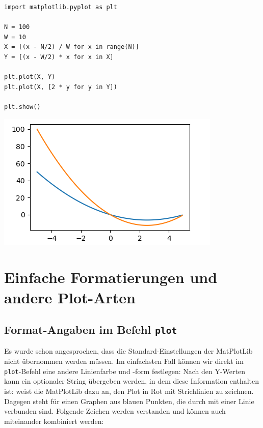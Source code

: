 \begin{codebox}[Beispiel: Zwei Graphen im selben Plot, width=.55\linewidth, nobeforeafter, equal height group = grpXmpSimplePlotTwoFunc]
\begin{verbatim}
import matplotlib.pyplot as plt

N = 100
W = 10
X = [(x - N/2) / W for x in range(N)]
Y = [(x - W/2) * x for x in X]

plt.plot(X, Y)
plt.plot(X, [2 * y for y in Y])

plt.show()
\end{verbatim}
\end{codebox}
%
\begin{tcolorbox}[title=Ausgabe: Zwei Graphen im selben Plot, width=.45\linewidth, nobeforeafter, equal height group = grpXmpSimplePlotTwoFunc]
	\includegraphics[width=\linewidth]{./gfx/plt-twoFuncs}
\end{tcolorbox}

\section{Einfache Formatierungen und andere Plot-Arten}
\subsection{Format-Angaben im Befehl \texttt{plot}}
Es wurde schon angesprochen, dass die Standard-Einstellungen der MatPlotLib nicht übernommen werden müssen. Im einfachsten Fall können wir direkt im \texttt{plot}-Befehl eine andere Linienfarbe und -form festlegen: Nach den Y-Werten kann ein optionaler String übergeben werden, in dem diese Information enthalten ist:
weist die MatPlotLib dazu an, den Plot in Rot mit Strichlinien zu zeichnen. Dagegen steht
für einen Graphen aus blauen Punkten, die durch mit einer Linie verbunden sind. Folgende Zeichen werden verstanden und können auch miteinander kombiniert werden:

